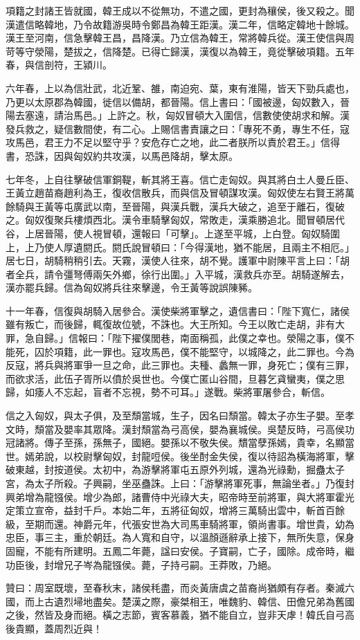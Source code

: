 \begin{pinyinscope}
項籍之封諸王皆就國，韓王成以不從無功，不遣之國，更封為穰侯，後又殺之。聞漢遣信略韓地，乃令故籍游吳時令鄭昌為韓王距漢。漢二年，信略定韓地十餘城。漢王至河南，信急擊韓王昌，昌降漢。乃立信為韓王，常將韓兵從。漢王使信與周苛等守滎陽，楚拔之，信降楚。已得亡歸漢，漢復以為韓王，竟從擊破項籍。五年春，與信剖符，王潁川。

六年春，上以為信壯武，北近鞏、雒，南迫宛、葉，東有淮陽，皆天下勁兵處也，乃更以太原郡為韓國，徙信以備胡，都晉陽。信上書曰：「國被邊，匈奴數入，晉陽去塞遠，請治馬邑。」上許之。秋，匈奴冒頓大入圍信，信數使使胡求和解。漢發兵救之，疑信數間使，有二心。上賜信書責讓之曰：「專死不勇，專生不任，寇攻馬邑，君王力不足以堅守乎？安危存亡之地，此二者朕所以責於君王。」信得書，恐誅，因與匈奴約共攻漢，以馬邑降胡，擊太原。

七年冬，上自往擊破信軍銅鞮，斬其將王喜。信亡走匈奴。與其將白土人曼丘臣、王黃立趙苗裔趙利為王，復收信散兵，而與信及冒頓謀攻漢。匈奴使左右賢王將萬餘騎與王黃等屯廣武以南，至晉陽，與漢兵戰，漢兵大破之，追至于離石，復破之。匈奴復聚兵樓煩西北。漢令車騎擊匈奴，常敗走，漢乘勝追北。聞冒頓居代谷，上居晉陽，使人視冒頓，還報曰「可擊」。上遂至平城，上白登。匈奴騎圍上，上乃使人厚遺閼氏。閼氏說冒頓曰：「今得漢地，猶不能居，且兩主不相厄。」居七日，胡騎稍稍引去。天霧，漢使人往來，胡不覺。護軍中尉陳平言上曰：「胡者全兵，請令彊弩傅兩矢外鄉，徐行出圍。」入平城，漢救兵亦至。胡騎遂解去，漢亦罷兵歸。信為匈奴將兵往來擊邊，令王黃等說誤陳豨。

十一年春，信復與胡騎入居參合。漢使柴將軍擊之，遺信書曰：「陛下寬仁，諸侯雖有叛亡，而後歸，輒復故位號，不誅也。大王所知。今王以敗亡走胡，非有大罪，急自歸。」信報曰：「陛下擢僕閭巷，南面稱孤，此僕之幸也。滎陽之事，僕不能死，囚於項籍，此一罪也。寇攻馬邑，僕不能堅守，以城降之，此二罪也。今為反寇，將兵與將軍爭一旦之命，此三罪也。夫種、蠡無一罪，身死亡；僕有三罪，而欲求活，此伍子胥所以僨於吳世也。今僕亡匿山谷間，旦暮乞貣蠻夷，僕之思歸，如痿人不忘起，盲者不忘視，勢不可耳。」遂戰。柴將軍屠參合，斬信。

信之入匈奴，與太子俱，及至頹當城，生子，因名曰頹當。韓太子亦生子嬰。至孝文時，頹當及嬰率其眾降。漢封頹當為弓高侯，嬰為襄城侯。吳楚反時，弓高侯功冠諸將。傳子至孫，孫無子，國絕。嬰孫以不敬失侯。穨當孽孫嫣，貴幸，名顯當世。嫣弟說，以校尉擊匈奴，封龍哣侯。後坐酎金失侯，復以待詔為橫海將軍，擊破東越，封按道侯。太初中，為游擊將軍屯五原外列城，還為光祿勳，掘蠱太子宮，為太子所殺。子興嗣，坐巫蠱誅。上曰：「游擊將軍死事，無論坐者。」乃復封興弟增為龍镪侯。增少為郎，諸曹侍中光祿大夫，昭帝時至前將軍，與大將軍霍光定策立宣帝，益封千戶。本始二年，五將征匈奴，增將三萬騎出雲中，斬首百餘級，至期而還。神爵元年，代張安世為大司馬車騎將軍，領尚書事。增世貴，幼為忠臣，事三主，重於朝廷。為人寬和自守，以溫顏遜辭承上接下，無所失意，保身固寵，不能有所建明。五鳳二年薨，諡曰安侯。子寶嗣，亡子，國除。成帝時，繼功臣後，封增兄子岑為龍镪侯。薨，子持弓嗣。王莽敗，乃絕。

贊曰：周室既壞，至春秋末，諸侯秏盡，而炎黃唐虞之苗裔尚猶頗有存者。秦滅六國，而上古遺烈埽地盡矣。楚漢之際，豪桀相王，唯魏豹、韓信、田儋兄弟為舊國之後，然皆及身而絕。橫之志節，賓客慕義，猶不能自立，豈非天虖！韓氏自弓高後貴顯，蓋周烈近與！


\end{pinyinscope}